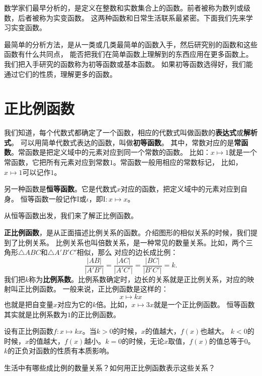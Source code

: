 \documentclass[12pt,UTF8]{ctexbook}
\begin{document}
数学家们最早分析的，是定义在整数和实数集合上的函数。前者被称为数列或级数，后者被称为实变函数。
这两种函数和日常生活联系最紧密。下面我们先来学习实变函数。

最简单的分析方法，是从一类或几类最简单的函数入手，然后研究别的函数和这些函数有什么共同点，
能否把我们在简单函数上理解到的东西应用在更多函数上。我们把入手研究的函数称为初等函数或基本函数。
如果初等函数选得好，我们能通过它们的性质，理解更多的函数。

\section{正比例函数}
我们知道，每个代数式都确定了一个函数，相应的代数式叫做函数的\textbf{表达式}或\textbf{解析式}。
可以用简单代数式表达的函数，叫做\textbf{初等函数}。
其中，常数对应的是\textbf{常函数}。常函数是把定义域中的元素对应到同一个常数的函数。
比如：$x\mapsto 1$就是一个常函数，它把所有元素对应到常数$1$。常函数一般用相应的常数标记，
比如，$x\mapsto 1$可以记作$1$。

另一种函数是\textbf{恒等函数}。它是代数式$x$对应的函数，把定义域中的元素对应到自身。
恒等函数一般记作$\mathrm{I}$或$\iota$，即$\mathrm{I}:x \mapsto x$。

从恒等函数出发，我们来了解正比例函数。

\textbf{正比例函数}，是从正面描述比例关系的函数。介绍图形的相似关系的时候，我们提到了比例关系。
比例关系也叫倍数关系，是一种常见的数量关系。比如，两个三角形$\triangle ABC$和$\triangle A'B'C'$相似，那么
对应的边长成比例：
$$ \frac{|AB|}{|A'B'|} = \frac{|AC|}{|A'C'|} = \frac{|BC|}{|B'C'|} = k.$$
我们把$k$称为\textbf{比例系数}。比例系数确定时，边长的关系就是正比例关系，对应的映射叫正比例函数。
一般来说，正比例函数是这样的：
$$ x \mapsto kx$$
也就是把自变量$x$对应为它的$k$倍。比如，$x \mapsto 3x$就是一个正比例函数。
恒等函数其实就是比例系数为$1$的正比例函数。

设有正比例函数$f: x\mapsto kx$。当$k>0$的时候，$x$的值越大，$f(x)$也越大。
$k<0$的时候，$x$的值越大，$f(x)$越小。$k=0$的时候，无论$x$取值，$f(x)$的值总等于$0$。
$k$的正负对函数的性质有本质影响。

\begin{sk}\label{sk:5-0-0}
    生活中有哪些成比例的数量关系？如何用正比例函数表示这些关系？
\end{sk}
\end{document}
